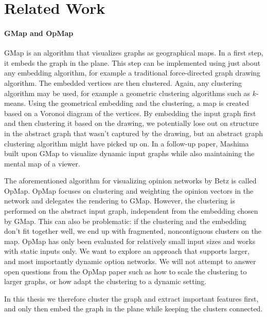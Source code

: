\section{Related Work}
\label{sect:related-work}


\paragraph{GMap and OpMap}

GMap \cite{gansner2009gmap} is an algorithm that visualizes graphs as geographical maps. In a first step, it embeds the graph in the plane. This step can be implemented using just about any embedding algorithm, for example a traditional force-directed graph drawing algorithm. The embedded vertices are then clustered. Again, any clustering algorithm may be used, for example a geometric clustering algorithms such as $k$-means. Using the geometrical embedding and the clustering, a map is created based on a Voronoi diagram of the vertices. By embedding the input graph first and then clustering it based on the drawing, we potentially lose out on structure in the abstract graph that wasn't captured by the drawing, but an abstract graph clustering algorithm might have picked up on. In a follow-up paper, Mashima \etal{} \cite{mashima2011visualizing} built upon GMap to visualize dynamic input graphs while also maintaining the mental map of a viewer.

The aforementioned algorithm for visualizing opinion networks by Betz \etal{} is called OpMap. OpMap focuses on clustering and weighting the opinion vectors in the network and delegates the rendering to GMap. However, the clustering is performed on the abstract input graph, independent from the embedding chosen by GMap. This can also be problematic: if the clustering and the embedding don't fit together well, we end up with fragmented, noncontiguous clusters on the map. OpMap has only been evaluated for relatively small input sizes and works with static inputs only. We want to explore an approach that supports larger, and most importantly dynamic option networks. We will not attempt to answer open questions from the OpMap paper such as how to scale the clustering to larger graphs, or how adapt the clustering to a dynamic setting.

In this thesis we therefore cluster the graph and extract important features first, and only then embed the graph in the plane while keeping the clusters connected.


